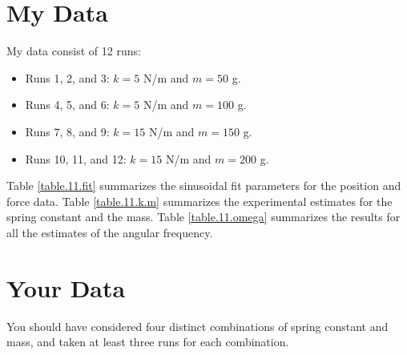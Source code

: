 \section{My Data}
My data consist of 12 runs:
\begin{itemize}
    \item Runs 1, 2, and 3: $k = 5$ N/m and $m = 50$ g.
    \item Runs 4, 5, and 6: $k = 5$ N/m and $m = 100$ g.
    \item Runs 7, 8, and 9: $k = 15$ N/m and $m = 150$ g.
    \item Runs 10, 11, and 12: $k = 15$ N/m and $m = 200$ g.
\end{itemize}
Table \ref{table.11.fit} summarizes the sinusoidal fit parameters for the position and force data. Table \ref{table.11.k.m} summarizes the experimental estimates for the spring constant and the mass. Table \ref{table.11.omega} summarizes the results for all the estimates of the angular frequency.
\section{Your Data}
You should have considered four distinct combinations of spring constant and mass, and taken at least three runs for each combination.
\newpage
